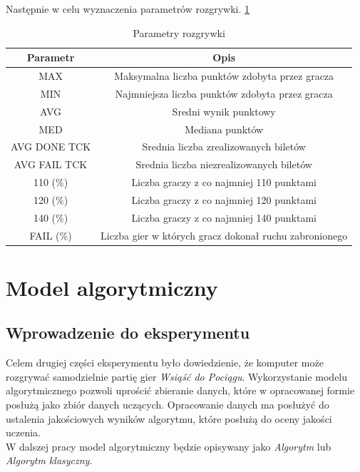 \documentclass[12pt, oneside]{report}
\begin{document}
Następnie w celu wyznaczenia parametrów rozgrywki.  \ref{table:outputparam}

\begin{table}[h]
	\begin{center}
		\begin{tabular}{| c | c |} \hline
			Parametr  & Opis \\ \hline
			MAX & Maksymalna liczba punktów zdobyta przez gracza \\ \hline
			MIN & Najmniejsza liczba punktów zdobyta przez gracza \\ \hline
			AVG & Sredni wynik punktowy \\ \hline
			MED & Mediana punktów \\ \hline
			AVG DONE TCK & Srednia liczba zrealizowanych biletów \\ \hline
			AVG FAIL TCK & Srednia liczba niezrealizowanych biletów \\ \hline
			110 (\%) & Liczba graczy z co najmniej 110 punktami \\ \hline
			120 (\%) & Liczba graczy z co najmniej 120 punktami \\ \hline
			140 (\%) & Liczba graczy z co najmniej 140 punktami \\ \hline
			FAIL (\%) & Liczba gier w których gracz dokonał ruchu zabronionego \\ \hline
		\end{tabular}
		\caption{Parametry rozgrywki}
		\label{table:outputparam}
	\end{center}
\end{table}

\chapter{Model algorytmiczny}
\label{model:algo}
\section{Wprowadzenie do eksperymentu}
Celem drugiej części eksperymentu było dowiedzienie, że komputer może rozgrywać samodzielnie partię gier \textit{Wsiąść do Pociągu}. Wykorzystanie modelu algorytmicznego pozwoli uprościć zbieranie danych, które w opracowanej formie posłużą jako zbiór danych uczących. Opracowanie danych ma posłużyć do ustalenia jakościowych wyników algorytmu, które posłużą do oceny jakości uczenia. \\
W dalszej pracy model algorytmiczny będzie opisywany jako \textit{Algorytm} lub \textit{Algorytm klasyczny}.
\end{document}
